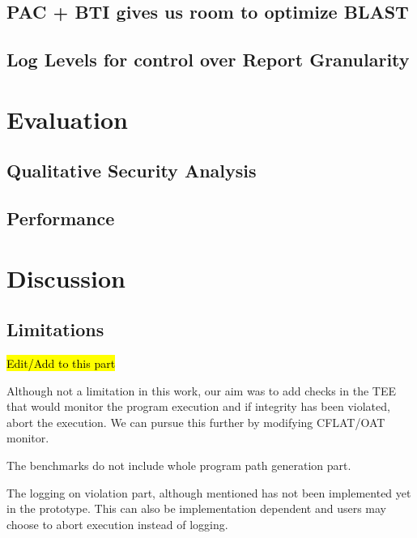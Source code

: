 \documentclass[a4paper, nobind]{templates/ociamthesis}
\begin{document}
\section{PAC + BTI gives us room to optimize BLAST}\label{pac-bti-gives-us-room-to-optimize-blast}

\section{Log Levels for control over Report Granularity}\label{log-levels-for-control-over-report-granularity}

\chapter{Evaluation}\label{evaluation}

\minitoc 

\section{Qualitative Security Analysis}\label{qualitative-security-analysis}

\section{Performance}\label{performance}

\chapter{Discussion}\label{discussion}

\minitoc 

\section{Limitations}\label{limitations-2}

\hl{Edit/Add to this part}

Although not a limitation in this work, our aim was to add checks in the TEE
that would monitor the program execution and if integrity has been violated,
abort the execution. We can pursue this further by modifying CFLAT/OAT monitor.

The benchmarks do not include whole program path generation part.

The logging on violation part, although mentioned has not been implemented yet
in the prototype. This can also be implementation dependent and users may choose
to abort execution instead of logging.
\end{document}
